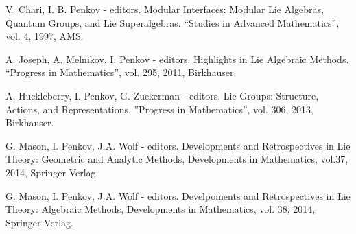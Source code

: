 \documentclass[11pt]{amsart}
\begin{document}
\myss \label{1.} V. Chari, I. B. Penkov - editors. Modular Interfaces: Modular Lie Algebras,
Quantum Groups, and Lie Superalgebras. ``Studies in Advanced Mathematics'', vol. 4, 1997, AMS. 

\myss \label{2.} A. Joseph, A. Melnikov, I. Penkov - editors. Highlights in Lie Algebraic Methods. ``Progress
in Mathematics'', vol. 295, 2011,  Birkhauser.

\myss \label{3.} A. Huckleberry, I. Penkov, G. Zuckerman - editors. Lie Groups: Structure, Actions, and Representations. ''Progress in Mathematics'', vol. 306, 2013, Birkhauser.

\myss \label{4.} G. Mason, I. Penkov, J.A. Wolf - editors. Developments and Retrospectives in Lie Theory: Geometric and Analytic Methods, Developments in Mathematics, vol.37, 2014, Springer Verlag.

\myss \label{5.} G. Mason, I. Penkov, J.A. Wolf - editors. Develpoments and Retrospectives in Lie Theory: Algebraic Methods, Developments in Mathematics, vol. 38, 2014, Springer Verlag.
\end{document}
